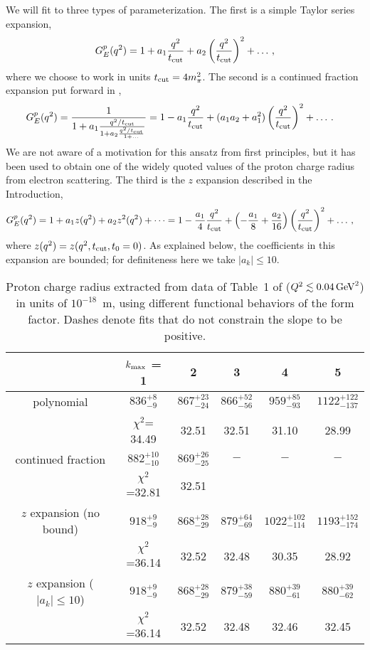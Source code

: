 \documentclass[12pt]{article}
\newcommand{\be}{\begin{equation}}
\newcommand{\ee}{\end{equation}}
\begin{document}
We will fit to three types of parameterization.  The first is 
a simple Taylor series expansion, 
\be\label{eq:taylor}
G_E^{p}(q^2) = 1 + a_1 {q^2 \over t_{\rm cut}} + a_2 \left(q^2 \over t_{\rm cut}\right)^2 + \dots \,, 
\ee
where we choose to work in units $t_{\rm cut}=4m_\pi^2$. 
The second is a continued fraction expansion put forward in \cite{Sick:2003gm}, 
\begin{align}\label{eq:cf}
G_E^{p}(q^2) &= {1 \over 1 + a_1 {q^2/t_{\rm cut}\over 1 + a_2 {q^2/t_{\rm cut}\over 1 + \dots}}} 
= 1 - a_1 {q^2\over t_{\rm cut}} + (a_1 a_2 + a_1^2) \left(q^2 \over t_{\rm cut}\right)^2 + \dots \,.
\end{align}
We are not aware of a motivation for this ansatz from first principles, but it
has been used to obtain one of the widely quoted values of the proton 
charge radius from electron scattering.   
The third is the $z$ expansion described in the Introduction,
\begin{align}
G_E^{p}(q^2) &= 1 + a_1 z(q^2) + a_2 z^2(q^2) + \dots 
= 1 -{a_1\over 4} {q^2\over t_{\rm cut}}  + \left( -{a_1\over 8} + {a_2 \over 16} \right) \left( q^2\over t_{\rm cut}\right)^2 + \dots 
\,,
\end{align}
where $z(q^2)=z(q^2,t_{\rm cut},t_0=0)$.  As explained below, the coefficients in this expansion
are bounded; for definiteness here we take $|a_k| \le 10$. 

\begin{table}
\begin{center}
\begin{tabular}{c|ccccc}
& $k_{\rm max}$ = 1 & 2 & 3 & 4 & 5 
\\
\hline 
polynomial & $836^{+8}_{-9}$ & $867^{+23}_{-24}$ & $866^{+52}_{-56}$ & $959^{+85}_{-93}$ & $1122^{+122}_{-137}$ 
\\
& $\chi^2$= 34.49 & 32.51 & 32.51 & 31.10 & 28.99 
\\
continued fraction & $882^{+10}_{-10}$ & $869^{+26}_{-25}$ & $-$ &$-$&$-$ 
\\
& $\chi^2$=32.81 & 32.51
\\
$z$ expansion (no bound) & $918^{+9}_{-9}$ & $868^{+28}_{-29}$ & $879^{+64}_{-69}$ & $1022^{+102}_{-114}$ & $1193^{+152}_{-174}$
\\
& $\chi^2$=36.14 & 32.52 & 32.48 & 30.35 & 28.92 
\\
$z$ expansion ($|a_k|\le 10$) & $918^{+9}_{-9}$ & $868^{+28}_{-29}$ & $879^{+38}_{-59}$ & $880^{+39}_{-61}$ & $880^{+39}_{-62}$ 
\\
& $\chi^2$=36.14 & 32.52 & 32.48 & 32.46 & 32.45 
\end{tabular} 
\end{center}
\caption{\label{tab:simplefits} 
Proton charge radius extracted from data of Table~1 of \cite{Rosenfelder:1999cd}  
($Q^2 \lesssim 0.04\,{\rm GeV}^2$) 
in units of $10^{-18}$~m, 
using different functional behaviors of the form factor.     
Dashes denote fits that do not constrain the slope to be positive. 
} 
\end{table}
\end{document}
